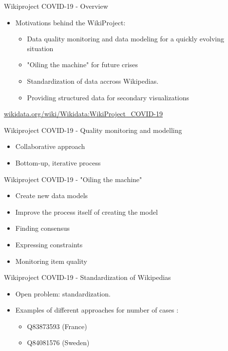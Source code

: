 \documentclass{beamer}
\begin{document}
\begin{frame}{Wikiproject COVID-19 - Overview}

\begin{itemize}
    \item Motivations behind the WikiProject:
    \begin{itemize}
        \item Data quality monitoring and data modeling for a quickly evolving situation
        \item "Oiling the machine" for future crises
        \item Standardization of data accross Wikipedias. 
        \item Providing structured data for secondary visualizations
    \end{itemize}
\end{itemize}

\url{wikidata.org/wiki/Wikidata:WikiProject_COVID-19}

\end{frame}


\begin{frame}{Wikiproject COVID-19 - Quality monitoring and modelling}
\begin{itemize}
    \item Collaborative approach
    \item Bottom-up, iterative process
\end{itemize}
\end{frame}


\begin{frame}{Wikiproject COVID-19 - "Oiling the machine"}
\begin{itemize}
    \item Create new data models 
    \item Improve the process itself of creating the model
    \item Finding consensus
    \item Expressing constraints
    \item Monitoring item quality
\end{itemize}
\end{frame}

\begin{frame}{Wikiproject COVID-19 - Standardization of Wikipedias}

\begin{itemize}
    \item Open problem: standardization. 
    \item Examples of different approaches for number of cases :
    \begin{itemize}
        \item Q83873593 (France) 
        \item Q84081576 (Sweden)
    \end{itemize}
\end{itemize}
\end{frame}
\end{document}
